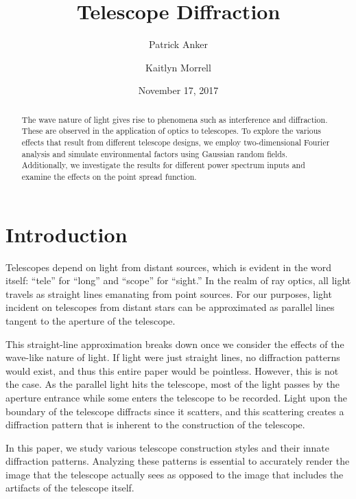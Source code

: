 \documentclass[%
 reprint,
 amsmath,amssymb,
 aps,
 pra,
]{revtex4-1}
\begin{document}
{\selectfont


\title{Telescope Diffraction}

\author{Patrick Anker}
\author{Kaitlyn Morrell}

\date{November 17, 2017}

\begin{abstract}
The wave nature of light gives rise to phenomena such as interference and diffraction. These are observed in the application of optics to telescopes. To explore the various effects that result from different telescope designs, we employ two-dimensional Fourier analysis and simulate environmental factors using Gaussian random fields. Additionally, we investigate the results for different power spectrum inputs and examine the effects on the point spread function.
\end{abstract}

\maketitle


\section{\label{sec:intro}Introduction}

Telescopes depend on light from distant sources, which is evident in the word itself: ``tele'' for ``long'' and ``scope'' for ``sight.'' In the realm of ray optics, all light travels as straight lines emanating from point sources. For our purposes, light incident on telescopes from distant stars can be approximated as parallel lines tangent to the aperture of the telescope.

This straight-line approximation breaks down once we consider the effects of the wave-like nature of light. If light were just straight lines, no diffraction patterns would exist, and thus this entire paper would be pointless. However, this is not the case. As the parallel light hits the telescope, most of the light passes by the aperture entrance while some enters the telescope to be recorded. Light upon the boundary of the telescope diffracts since it scatters, and this scattering creates a diffraction pattern that is inherent to the construction of the telescope.

In this paper, we study various telescope construction styles and their innate diffraction patterns. Analyzing these patterns is essential to accurately render the image that the telescope actually sees as opposed to the image that includes the artifacts of the telescope itself.

}
\end{document}
